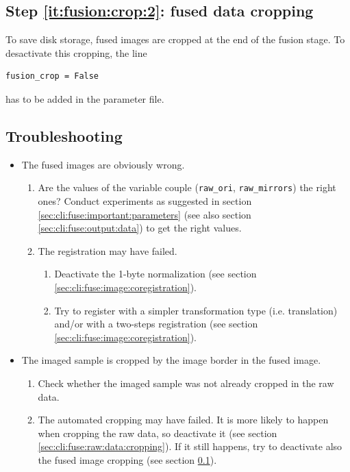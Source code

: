 \subsection{Step \ref{it:fusion:crop:2}: fused data cropping}
\label{sec:cli:fuse:fused:data:cropping}

To save disk storage, fused images are cropped at the end of the fusion stage. To desactivate this cropping, the line
\begin{verbatim}
fusion_crop = False
\end{verbatim}
has to be added in the parameter file.

\subsection{Troubleshooting}

\begin{itemize}

\item The fused images are obviously wrong.
  \begin{enumerate}
  \item Are the values of the variable couple (\texttt{raw\_ori}, \texttt{raw\_mirrors}) the right ones? Conduct experiments as suggested in section \ref{sec:cli:fuse:important:parameters}  (see also section \ref{sec:cli:fuse:output:data}) to get the right values.
  \item The registration may have failed.
    \begin{enumerate}
    \item Deactivate the 1-byte normalization (see section \ref{sec:cli:fuse:image:coregistration}).
    \item Try to register with a simpler transformation type (i.e. translation) and/or with a two-steps registration (see section \ref{sec:cli:fuse:image:coregistration}).
    \end{enumerate}
  \end{enumerate}
\item The imaged sample is cropped by the image border in the fused image.
  \begin{enumerate}
  \item Check whether the imaged sample was not already cropped in the raw data.
  \item The automated cropping may have failed. It is more likely to happen when cropping the raw data, so deactivate it (see section \ref{sec:cli:fuse:raw:data:cropping}). If it still happens, try to deactivate also the fused image cropping   (see section \ref{sec:cli:fuse:fused:data:cropping}).
  \end{enumerate}
\end{itemize}

